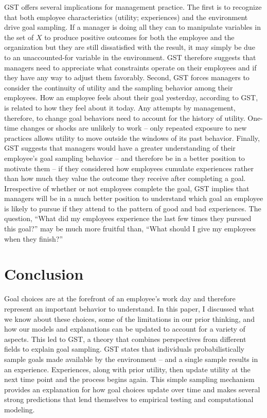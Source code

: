 \documentclass[english,,man]{apa6}
\theoremstyle{definition}
\theoremstyle{definition}
\theoremstyle{definition}
\theoremstyle{remark}
\begin{document}
GST offers several implications for management practice. The first is to
recognize that both employee characteristics (utility; experiences) and
the environment drive goal sampling. If a manager is doing all they can
to manipulate variables in the set of \(X\) to produce positive outcomes
for both the employee and the organization but they are still
dissatisfied with the result, it may simply be due to an unaccounted-for
variable in the environment. GST therefore suggests that managers need
to appreciate what constraints operate on their employees and if they
have any way to adjust them favorably. Second, GST forces managers to
consider the continuity of utility and the sampling behavior among their
employees. How an employee feels about their goal yesterday, according
to GST, is related to how they feel about it today. Any attempts by
management, therefore, to change goal behaviors need to account for the
history of utility. One-time changes or shocks are unlikely to work --
only repeated exposure to new practices allows utility to move outside
the windows of its past behavior. Finally, GST suggests that managers
would have a greater understanding of their employee's goal sampling
behavior -- and therefore be in a better position to motivate them -- if
they considered how employees cumulate experiences rather than how much
they value the outcome they receive after completing a goal.
Irrespective of whether or not employees complete the goal, GST implies
that managers will be in a much better position to understand which goal
an employee is likely to pursue if they attend to the pattern of good
and bad experiences. The question, \enquote{What did my employees
experience the last few times they pursued this goal?} may be much more
fruitful than, \enquote{What should I give my employees when they
finish?}

\hypertarget{conclusion}{%
\section{Conclusion}\label{conclusion}}

Goal choices are at the forefront of an employee's work day and
therefore represent an important behavior to understand. In this paper,
I discussed what we know about these choices, some of the limitations in
our prior thinking, and how our models and explanations can be updated
to account for a variety of aspects. This led to GST, a theory that
combines perspectives from different fields to explain goal sampling.
GST states that individuals probabilistically sample goals made
available by the environment -- and a single sample results in an
experience. Experiences, along with prior utility, then update utility
at the next time point and the process begins again. This simple
sampling mechanism provides an explanation for how goal choices update
over time and makes several strong predictions that lend themselves to
empirical testing and computational modeling.
\end{document}
